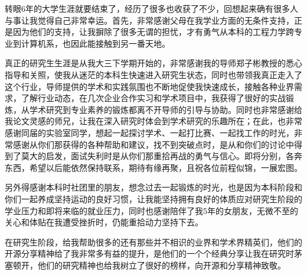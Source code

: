 \documentclass{sysuthesis} %
\numberwithin{algorithm}{chapter}
\theoremstyle{plain}
\theoremstyle{definition}
\theoremstyle{definition}
\begin{document}
\begin{Acknowledgement}
	转眼6年的大学生涯就要结束了，经历了很多也收获了不少，回想起来确有很多人与事让我觉得自己非常幸运。首先，非常感谢父母在我学业方面的无条件支持，正是因为他们的支持，让我摒除了很多无谓的担忧，才有勇气从本科的工程力学跨专业到计算机系，也因此能接触到另一番天地。
	
	真正的研究生生涯是从我大三下学期开始的，非常感谢我的导师郑子彬教授的悉心指导和关照，使我从迷茫的本科生快速进入研究生状态，同时也带领我真正走入了这个行业，导师提供的学术和实践氛围也不断地促使我快速成长，接触各种业界需求，了解行业动态，在几次企业合作实习和学术项目中，我获得了很好的实战锻炼，从学术研究到专业素养的锻炼都离不开导师的引导与协助。同时也非常感谢给我论文灵感的师兄，让我在深入研究时体会到学术研究的乐趣所在；在此，也非常感谢同届的实验室同学，想起一起探讨学术、一起打比赛、一起找工作的时光，非常感谢从你们那获得的各种帮助和建议，找不到突破点时，是从和你们的讨论中得到了莫大的启发，面试失利时是从你们那重拾再战的勇气与信心。即将分别，各奔东西，希望以后能依然保持联系，期待有缘再聚，且祝各位前程似锦，一展宏图。
	
	另外得感谢本科时社团里的朋友，想念过去一起锻炼的时光，也是因为本科阶段和你们一起养成坚持运动的良好习惯，让我能坚持拥有良好的体质应对研究生阶段的学业压力和即将来临的就业压力，同时也感谢陪伴了我5年的女朋友，无微不至的关心和体贴在我遭受挫折时，仍能重拾动力坚持下去。

	在研究生阶段，给我帮助很多的还有那些并不相识的业界和学术界精英们，他们的开源分享精神给了我非常多有益的提升，是他们的一个个经典分享让我在研究时茅塞顿开，他们的研究精神也给我树立了很好的榜样，向开源和分享精神致敬。



\end{Acknowledgement}
\end{document}
